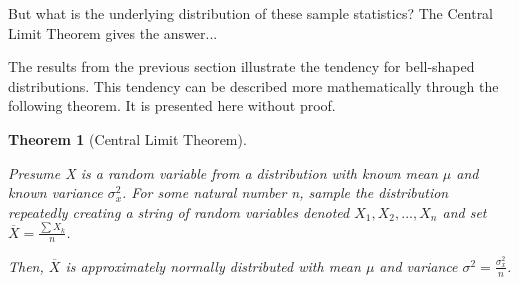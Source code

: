 \documentclass[10pt,]{book}
\theoremstyle{plain}
\newtheorem{theorem}{Theorem}[section]
\theoremstyle{definition}
\theoremstyle{definition}
\theoremstyle{definition}
\numberwithin{equation}{section}
\begin{document}
But what is the underlying distribution of these sample statistics?  The Central Limit Theorem gives the answer...%
\par
The results from the previous section illustrate the tendency for bell-shaped distributions. This tendency can be described more mathematically through the following theorem. It is presented here without proof.
%
\begin{theorem}[{Central Limit Theorem}]\label{theorem-63}

	Presume X is a random variable from a distribution with known mean \(\mu\) and known variance \(\sigma_x^2\).  
	For some natural number n, sample the distribution repeatedly creating a string of random variables denoted \(X_1, X_2, ... , X_n\) and set \(\overline{X} = \frac{\sum X_k}{n}\). 
\par
 
	Then, \(\overline{X}\) is approximately normally distributed with mean \(\mu\) and variance \(\sigma^2 = \frac{\sigma_x^2}{n}\).
\end{theorem}
\par
\end{document}
